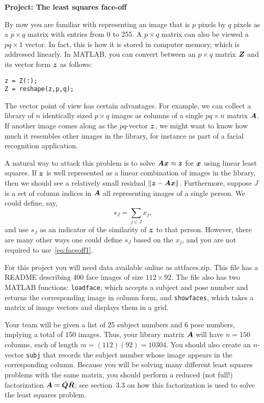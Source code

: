 \documentclass[11pt,twoside]{article}
\begin{document}
\begin{center}
  \bf Project: The least squares face-off
\end{center}

By now you are familiar with representing an image that is $p$ pixels by $q$ pixels as a $p\times q$ matrix with entries from 0 to 255. A $p\times q$ matrix can also be viewed a $pq\times 1$ vector. In fact, this is how it is stored in computer memory, which is addressed linearly. In MATLAB, you can convert between an $p \times q$ matrix $\bm{Z}$ and its vector form $\bm{z}$ as follows:
\begin{verbatim}
z = Z(:);
Z = reshape(z,p,q);
\end{verbatim}
The vector point of view has certain advantages. For example, we can collect a library of $n$ identically sized $p\times q$ images as columns of a single $pq \times n$ matrix $\bm{A}$. If another image comes along as the $pq$-vector $\bm{z}$, we might want to know how much it resembles other images in the library, for instance as part of a facial recognition application. 

A natural way to attack this problem is to solve $\bm{A}\bm{x}\approx\bm{z}$ for $\bm{x}$ using linear least squares. If $\bm{z}$ is well represented as a linear combination of
images in the library, then we should see a relatively small residual $\|\bm{z}-\bm{A}\bm{x}\|$. Furthermore, suppose $J$ is a set of column indices in $\bm{A}$ all representing images of a single person. We could define, say,
\begin{equation}
  \label{eq:faceoff1}
  s_J = \sum_{j\in J} x_j,
\end{equation}
and use $s_J$ as an indicator of the similarity of $\bm{z}$ to that person. However, there are many other ways one could define $s_J$ based on the $x_j$, and you are not required to use~\eqref{eq:faceoff1}. 

For this project you will need data available online as \textsf{attfaces.zip}. This file has a README describing 400 face images of size $112\times 92$. The file also has two MATLAB functions: \texttt{loadface}, which accepts a subject and pose number and returns the corresponding image in column form, and \texttt{showfaces}, which takes a matrix of image vectors and displays them in a grid. 

Your team will be given a list of 25 subject numbers and 6 pose numbers, implying a total of 150 images. Thus, your library matrix $\bm{A}$ will have $n=150$ columns, each of length $m=(112)(92)=10304$. You should also create an $n$-vector \texttt{subj} that records the subject number whose image appears in the corresponding column. Because you will be solving many different least squares problems with the same matrix, you should perform a reduced (not full!) factorization $\bm{A}=\hat{\bm{Q}}\hat{\bm{R}}$; see section~3.3 on how this factorization is used to solve the least squares problem.
\end{document}
